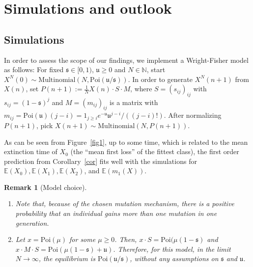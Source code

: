 \documentclass{imsart}
\theoremstyle{plain}
\newtheorem{remark}[theorem]{Remark}
\theoremstyle{definition}
\begin{document}
\section{Simulations and outlook}
\label{ss:interpretation}

\subsection{Simulations}\label{simul}
\sloppy
In order to assess the scope of our findings, we implement a Wright-Fisher model as follows: For fixed $\mathfrak s \in [0,1)$, $\mathfrak u \geq 0$ and $N\in \mathbb N$, start $X^N(0) \sim \text{Multinomial}(N, \text{Poi}(\mathfrak u/ \mathfrak s))$. In order to generate $X^N(n+1)$ from $X(n)$, set $P(n+1) := \tfrac 1N X(n) \cdot S \cdot M$, where $S = (s_{ij})_{ij}$ with $s_{ij} = (1 - \mathfrak s)^j$ and $M = (m_{ij})_{ij}$ is a matrix with $m_{ij} = \text{Poi}(\mathfrak u)(j-i) = 1_{j \geq i} e^{-\mathfrak u} \mathfrak u^{j-i}/((j-i)!)$. After normalizing $P(n+1)$, pick $X(n+1) \sim \text{Multinomial}(N, P(n+1))$. 

As can be seen from Figure~\ref{fig1}, up to some time, which is related to the mean extinction time of $X_0$ (the ``mean first loss'' of the fittest class), the first order prediction from Corollary~\ref{cor} fits well with the simulations for $\mathbb E(X_0), \mathbb E(X_1), \mathbb E(X_2)$, and $\mathbb E(m_1(X))$. 

\begin{remark}[Model choice]
\begin{enumerate}
    \item Note that, because of the chosen mutation mechanism, there is a positive probability  that an individual gains more than one mutation in one generation.
    \item Let $x = \text{Poi}(\mu)$ for some $\mu \geq 0$. Then, $x\cdot S = \text{Poi}(\mu(1 - \mathfrak s)$ and $x \cdot M \cdot S = \text{Poi}(\mu(1 - \mathfrak s) + \mathfrak u)$. Therefore, for this model, in the limit $N \to \infty$, the equilibrium is $\text{Poi}(\mathfrak u/ \mathfrak s)$, without any assumptions on $\mathfrak s$ and $\mathfrak u$. 
\end{enumerate}   
\end{remark}
\end{document}
